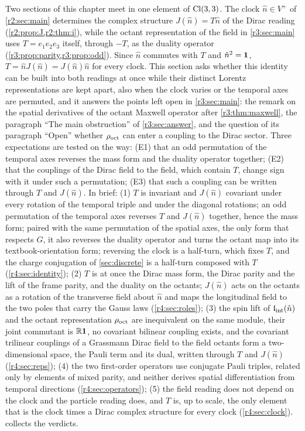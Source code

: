 Two sections of this chapter meet in one element of $\mathrm{Cl}(3,3)$. The clock $\hat n\in V^+$ of \cref{r2:sec:main} determines the complex structure
$J(\hat n)=T\hat n$ of the Dirac reading (\cref{r2:prop:J,r2:thm:i}), while the octant representation of the field in \cref{r3:sec:main} uses $T=e_1e_2e_3$
itself, through $-T$, as the duality operator (\cref{r3:prop:parity,r3:prop:odd}). Since $\hat n$ commutes with $T$ and $\hat n^2=\mathbf 1$,
$T=\hat nJ(\hat n)=J(\hat n)\hat n$ for every clock. This section asks whether this identity can be built into both readings at once while their distinct
Lorentz representations are kept apart, also when the clock varies or the temporal axes are permuted, and it answers the points left open
in \cref{r3:sec:main}: the remark on the spatial derivatives of the octant Maxwell operator after \cref{r3:thm:maxwell}, the paragraph ``The
main obstruction'' of \cref{r3:sec:answer}, and the question of its paragraph ``Open'' whether $\rho_{\rm oct}$ can enter a coupling to the Dirac
sector. Three expectations are tested on the way: (E1) that an odd permutation of the temporal axes reverses the mass form and the duality
operator together; (E2) that the couplings of the Dirac field to the field, which contain $T$, change sign with it under such a permutation;
(E3) that such a coupling can be written through $T$ and $J(\hat n)$. In brief:
(1) $T$ is invariant and $J(\hat n)$ covariant under every rotation of the temporal triple and under the diagonal rotations; an odd permutation of the
temporal axes reverses $T$ and $J(\hat n)$ together, hence the mass form; paired with the same permutation of the spatial axes, the only form that
respects $G$, it also reverses the duality operator and turns the octant map into its textbook-orientation form; reversing the clock is a
half-turn, which fixes $T$, and the charge conjugation of \cref{sec:discrete} is a half-turn composed with $T$ (\cref{r4:sec:identity});
(2) $T$ is at once the Dirac mass form, the Dirac parity and the lift of the frame parity, and the duality on the octants; $J(\hat n)$ acts on the
octants as a rotation of the transverse field about $\hat n$ and maps the longitudinal field to the two poles that carry the Gauss laws
(\cref{r4:sec:roles});
(3) the spin lift of $\mathfrak l_{\rm int}(\hat n)$ and the octant representation $\rho_{\rm oct}$ are inequivalent on the same module, their joint commutant is $\mathbb{R}\mathbf 1$,
no covariant bilinear coupling exists, and the covariant trilinear couplings of a Grassmann Dirac field to the field octants form a
two-dimensional space, the Pauli term and its dual, written through $T$ and $J(\hat n)$ (\cref{r4:sec:reps});
(4) the two first-order operators use conjugate Pauli triples, related only by elements of mixed parity, and neither derives spatial
differentiation from temporal directions (\cref{r4:sec:operators});
(5) the field reading does not depend on the clock and the particle reading does, and $T$ is, up to scale, the only element that is the clock
times a Dirac complex structure for every clock (\cref{r4:sec:clock}).  collects the verdicts.

